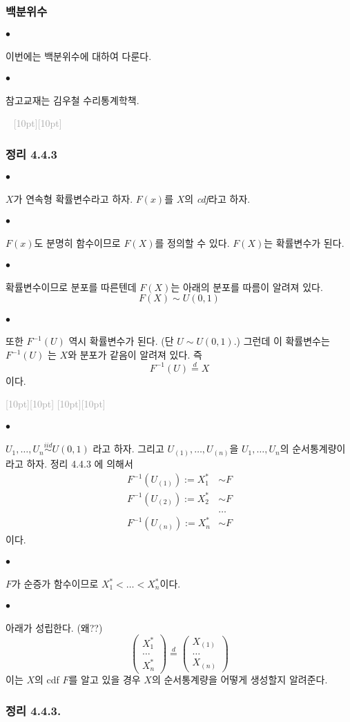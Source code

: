 \documentclass[12pt,oneside,english]{book}
\newcommand{\dash}{\vspace{2em}\noindent \textcolor{darkgray}{\hrulefill~ \raisebox{-2.5pt}[10pt][10pt]{\leafright \decofourleft \decothreeleft  \aldineright \decotwo \floweroneleft \decoone   \floweroneright \decotwo \aldineleft\decothreeright \decofourright \leafleft} ~  \hrulefill \\ \vspace{2em}}}
\newcommand{\rdash}{\noindent \textcolor{darkgray}{ \raisebox{-1.9pt}[10pt][10pt]{\leafright} \hrulefill \raisebox{-1.9pt}[10pt][10pt]{\leafright \decofourleft \decothreeleft  \aldineright \decotwo \floweroneleft \decoone}}}
\def\ck{\paragraph{\Large$\bullet$}\Large}
\begin{document}
\subsubsection{백분위수}

\ck 이번에는 백분위수에 대하여 다룬다. 
\ck 참고교재는 김우철 수리통계학책. 

\dash
\subsubsection{정리 4.4.3} 
\ck $X$가 연속형 확률변수라고 하자. $F(x)$를 $X$의 \emph{cdf}라고 하자. 

\ck $F(x)$도 분명히 함수이므로 $F(X)$를 정의할 수 있다. $F(X)$는 확률변수가 된다. 

\ck 확률변수이므로 분포를 따른텐데 $F(X)$는 아래의 분포를 따름이 알려져 있다. 
\[
F(X) \sim U(0,1)
\]

\ck 또한 $F^{-1}(U)$ 역시 확률변수가 된다. (단 $U\sim U(0,1)$.) 그런데 이 확률변수는 $F^{-1}(U)$ 는 $X$와 분포가 같음이 알려져 있다. 즉 
\[
F^{-1}(U)\overset{d}{=}X 
\]
이다. 

\rdash 

\ck $U_1,\dots,U_n \overset{iid}{\sim} U(0,1)$ 라고 하자. 그리고 $U_{(1)},\dots,U_{(n)}$을 $U_1,\dots,U_n$의 순서통계량이라고 하자. 정리 4.4.3 에 의해서 
\begin{align*}
F^{-1}(U_{(1)}):=X_1^* & \sim F \\
F^{-1}(U_{(2)}):=X_2^* & \sim F \\
& \dots \\ 
F^{-1}(U_{(n)}):=X_n^* & \sim F
\end{align*}
이다. 

\ck $F$가 순증가 함수이므로 $X_1^*<\dots<X_n^*$이다. 

\ck 아래가 성립한다. (왜??)
\[
\begin{pmatrix}
X_1^* \\ \dots \\ X_n^*
\end{pmatrix}\overset{d}{=}
\begin{pmatrix}
X_{(1)} \\ \dots \\ X_{(n)}
\end{pmatrix}
\]
이는 $X$의 cdf $F$를 알고 있을 경우 $X$의 순서통계량을 어떻게 생성할지 알려준다. 

\subsubsection{정리 4.4.3.} 
\end{document}
